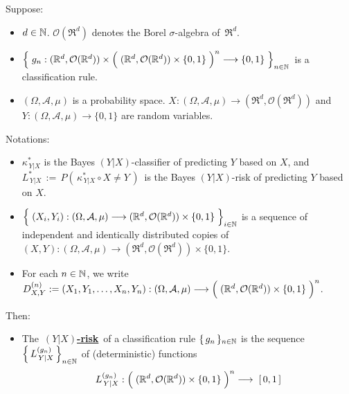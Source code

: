 \vskip 0.5cm
\begin{definition}
\mbox{}\vskip 0.1cm
\noindent
Suppose:
\begin{itemize}
\item
	$d \in \mathbb{N}$.
	$\mathcal{O}(\Re^{d})$ denotes the Borel $\sigma$-algebra of \,$\Re^{d}$.
\item
	$\left\{\;
		g_{n} :
		(\Re^{d},\mathcal{O}(\Re^{d}))
			\times
			\left(\;(\Re^{d},\mathcal{O}(\Re^{d})) \overset{{\color{white}.}}{\times} \{0,1\} \;\right)^{n}
		\longrightarrow
		\{0,1\}
	\;\right\}_{n\in\N}$
	\,is a classification rule.
\item
	$(\Omega,\mathcal{A},\mu)$ is a probability space.
	$X : (\Omega,\mathcal{A},\mu) \longrightarrow (\Re^{d},\mathcal{O}(\Re^{d}))$ and\,
	$Y : (\Omega,\mathcal{A},\mu) \longrightarrow \{0,1\}$
	are random variables.
\end{itemize}
Notations:
\begin{itemize}
\item
	$\kappa^{*}_{\,Y \vert X}$ is the Bayes $(Y \vert X)$-classifier of predicting $Y$ based on $X$,
	and $L^{*}_{\,Y \vert X} \,:=\, P\!\left(\,\kappa^{*}_{\,Y \vert X} \circ X \neq Y\,\right)$\,
	is the Bayes $(Y \vert X)$-risk of predicting $Y$ based on $X$.
\item
	$\left\{\;
		(X_{i},Y_{i}) : (\Omega,\mathcal{A},\mu)
			\overset{{\color{white}-}}{\longrightarrow}
			(\Re^{d},\mathcal{O}(\Re^{d})) \times \{0,1\}
	\;\right\}_{i\in\N}$\;
	is a sequence of independent and identically distributed copies of
	$(X,Y) : (\Omega,\mathcal{A},\mu) \longrightarrow (\Re^{d},\mathcal{O}(\Re^{d})) \times \{0,1\}$.
\item
	For each $n \in \mathbb{N}$, we write
	$D^{(n)}_{X,Y} := (X_{1},Y_{1},\ldots,X_{n},Y_{n}) :
		(\Omega,\mathcal{A},\mu)
		\longrightarrow
		\left(\;(\Re^{d},\mathcal{O}(\Re^{d})) \overset{{\color{white}.}}{\times} \{0,1\} \;\right)^{n}$.
\end{itemize}
Then:
\begin{itemize}
\item
	The \,\underline{\textbf{$(Y \vert X)$-risk}}\, of a classification rule $\{\,g_{n}\,\}_{n\in\mathbb{N}}$
	is the sequence $\left\{\,L^{(g_{n})}_{\,Y \vert X}\,\right\}_{n\in\mathbb{N}}$ of (deterministic) functions
	\begin{equation*}
	L^{(g_{n})}_{\,Y \vert X} :
		\left(\;(\Re^{d},\mathcal{O}(\Re^{d})) \overset{{\color{white}.}}{\times} \{0,1\} \;\right)^{n} \longrightarrow\; [\,0,1\,]

\end{equation*}
\end{itemize}
\end{definition}

